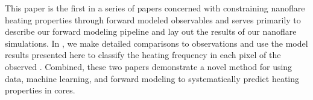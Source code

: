 This paper is the first in a series of papers concerned with constraining nanoflare heating properties through forward modeled observables and serves primarily to describe our forward modeling pipeline and lay out the results of our nanoflare simulations. In \citet[ hereafter]{barnes_understanding_2018-1}, we make detailed comparisons to observations and use the model results presented here to classify the heating frequency in each pixel of the observed \AR{}. Combined, these two papers demonstrate a novel method for using data, machine learning, and forward modeling to systematically predict heating properties in \AR{} cores.
